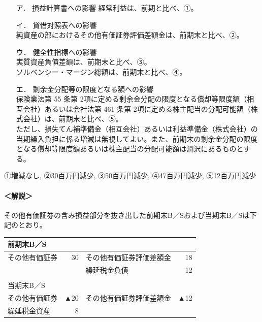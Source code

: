 \documentclass[report,gutter=10mm,fore-edge=10mm,uplatex,dvipdfmx]{jlreq}
\begin{document}
\begin{itemize}
 \item [ア．] 損益計算書への影響 経常利益は、前期と比べ、①。
 \item [イ．] 貸借対照表への影響\\
純資産の部におけるその他有価証券評価差額金は、前期末と比べ、②。
 \item [ウ．] 健全性指標への影響\\
 実質資産負債差額は、前期末と比べ、③。\\
ソルベンシー・マージン総額は、前期末と比べ、④。
 \item [エ．] 剰余金分配等の限度となる額への影響\\
 保険業法第 55 条第 2項に定める剰余金分配の限度となる償却等限度額（相互会社）あるいは会社法第
461 条第 2項に定める株主配当の分配可能額（株式会社）は、前期末と比べ、⑤。\\
ただし、損失てん補準備金（相互会社）あるいは利益準備金（株式会社）の当期繰入負担に係る増減は無視してよい。また、前期末の剰余金分配の限度となる償却等限度額あるいは株主配当の分配可能額は潤沢にあるものとする。

\end{itemize}


①増減なし, ②30百万円減少, ③50百万円減少, ④47百万円減少, ⑤12百万円減少\\


\paragraph{＜解説＞}
その他有価証券の含み損益部分を抜き出した前期末B／Sおよび当期末B／Sは下記のとおり。


\begin{tabular}{lrlr}
\\
前期末B／S\\ \hline
その他有価証券& 30  & その他有価証券評価差額金 &18 \\ 
& & 繰延税金負債 &12\\ \\
当期末B／S\\ \hline
その他有価証券 & ▲20& その他有価証券評価差額金 & ▲12\\ 
繰延税金資産 & 8\\
\end{tabular}
\end{document}
